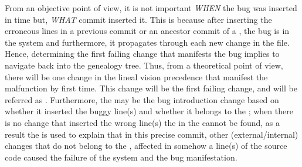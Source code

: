 \documentclass[a4paper, 12pt]{book}
\begin{document}


From an objective point of view, it is not important \emph{WHEN} the bug was inserted in time but, \emph{WHAT} commit inserted it. This is because after inserting the erroneous lines in a previous commit or an ancestor commit of a \BFC, the bug is in the system and furthermore, it propagates through each new change in the file. Hence, determining the first failing change that manifests the bug implies to navigate back into the genealogy tree. Thus, from a theoretical point of view, there will be one change in the lineal vision precedence that manifest the malfunction by first time. This change will be the first failing change, and will be referred as \FFC. Furthermore, the \FFC may be the bug introduction change based on whether it inserted the buggy line(s) and whether it belongs to the \ACSet{\BFC}; when there is no change that inserted the wrong line(s) the \BIC in the \ACSet{\BFC} cannot be found, as a result the \FFC is used to explain that in this precise commit, other (external/internal) changes that do not belong to the \ACSet{\BFC}, affected in somehow a line(s) of the source code caused the failure of the system and the bug manifestation.



\end{document}
